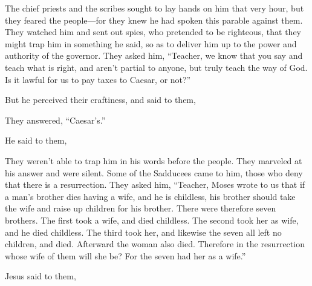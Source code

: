 {\par }{
\par }{\Q {}
\par }{
\par }{\PP {}The chief priests and the scribes sought to lay hands on him that very hour, but they feared the people—for they knew he had spoken this parable against them.
They watched him and sent out spies, who pretended to be righteous, that they might trap him in something he said, so as to deliver him up to the power and authority of the governor.
They asked him, “Teacher, we know that you say and teach what is right, and aren’t partial to anyone, but truly teach the way of God.
Is it lawful for us to pay taxes to Caesar, or not?”
\par }{\PP {}But he perceived their craftiness, and said to them,
{}
\par }{\PP They answered, “Caesar’s.”
\par }{\PP {}He said to them,
{}
\par }{\PP {}They weren’t able to trap him in his words before the people. They marveled at his answer and were silent.
Some of the Sadducees came to him, those who deny that there is a resurrection.
They asked him, “Teacher, Moses wrote to us that if a man’s brother dies having a wife, and he is childless, his brother should take the wife and raise up children for his brother.
There were therefore seven brothers. The first took a wife, and died childless.
The second took her as wife, and he died childless.
The third took her, and likewise the seven all left no children, and died.
Afterward the woman also died.
Therefore in the resurrection whose wife of them will she be? For the seven had her as a wife.”
\par }{\PP {}Jesus said to them,
{}
}
